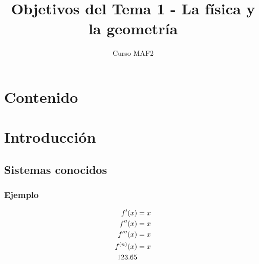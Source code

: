 \documentclass[12pt]{beamer}
\title{\large{Objetivos del Tema 1 - La física y la geometría}}
\subtitle{Curso MAF2}
\begin{document}
\maketitle
\fontsize{14}{14}\selectfont
\section*{Contenido}
\section{Introducción}
\subsection{Sistemas conocidos}
\begin{frame}
\frametitle{Ejemplo}
\begin{align*}
{f}^{\prime}(x) &= x \\
{f}^{\prime \prime}(x) &= x \\
{f}^{\prime \prime \prime}(x) &= x \\
{f}^{(n)}(x) &= x \\
123.65
\end{align*}
\end{frame}
\end{document}
